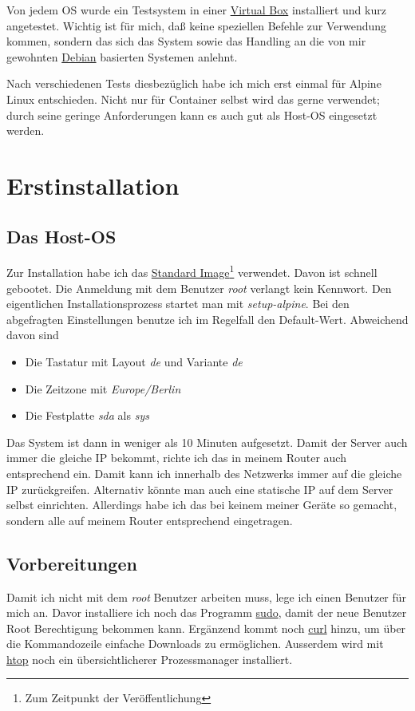 \documentclass[12pt,a4paper,ngerman]{article}
\newcommand{\code}[1]{\textit{#1}}
\begin{document}
Von jedem OS wurde ein Testsystem in einer
\href{https://www.virtualbox.org/}{Virtual Box} installiert und kurz angetestet.
Wichtig ist für mich, daß keine speziellen Befehle zur Verwendung kommen,
sondern das sich das System sowie das Handling an die von mir gewohnten
\href{https://www.debian.org/index.de.html} {Debian} basierten Systemen anlehnt.

Nach verschiedenen Tests diesbezüglich habe ich mich erst einmal für Alpine
Linux entschieden. Nicht nur für Container selbst wird das gerne verwendet;
durch seine geringe Anforderungen kann es auch gut als Host-OS eingesetzt
werden.

\section{Erstinstallation}
\subsection{Das Host-OS}
Zur Installation habe ich das
\href{http://dl-cdn.alpinelinux.org/alpine/v3.8/releases/x86_64/alpine-standard-3.10.2-x86_64.iso}{Standard Image}\footnote{Zum
    Zeitpunkt der Veröffentlichung} verwendet. Davon ist schnell gebootet. Die
Anmeldung mit dem Benutzer \code{root} verlangt kein Kennwort. Den eigentlichen
Installationsprozess startet man mit \code{setup-alpine}. Bei den abgefragten
Einstellungen benutze ich im Regelfall den Default-Wert. Abweichend davon sind

\begin{itemize}
    \item Die Tastatur mit Layout \code{de} und Variante \code{de}
    \item Die Zeitzone mit \code{Europe/Berlin}
    \item Die Festplatte \code{sda} als \code{sys}
\end{itemize}

Das System ist dann in weniger als 10 Minuten aufgesetzt. Damit der Server auch
immer die gleiche IP bekommt, richte ich das in meinem Router auch entsprechend
ein. Damit kann ich innerhalb des Netzwerks immer auf die gleiche IP
zurückgreifen. Alternativ könnte man auch eine statische IP auf dem Server
selbst einrichten. Allerdings habe ich das bei keinem meiner Geräte so gemacht,
sondern alle auf meinem Router entsprechend eingetragen.

\subsection{Vorbereitungen}
Damit ich nicht mit dem \code{root} Benutzer arbeiten muss, lege ich einen
Benutzer für mich an. Davor installiere ich noch das Programm
\href{https://de.wikipedia.org/wiki/Sudo}{sudo}, damit der neue Benutzer Root
Berechtigung bekommen kann. Ergänzend kommt noch
\href{https://curl.haxx.se/}{curl} hinzu, um über die Kommandozeile einfache
Downloads zu ermöglichen. Ausserdem wird mit
\href{https://hisham.hm/htop/index.php?page=main}{htop} noch ein
übersichtlicherer Prozessmanager installiert.
\end{document}
